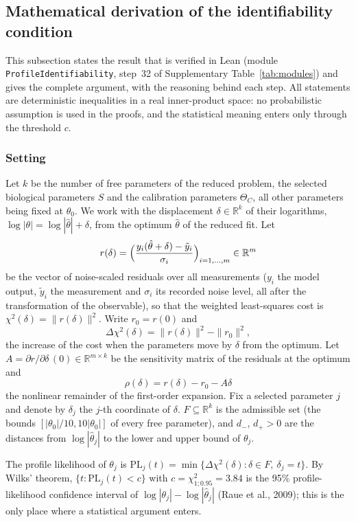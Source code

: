 \subsection*{Mathematical derivation of the identifiability condition}

This subsection states the result that is verified in Lean (module \texttt{ProfileIdentifiability}, step~32 of Supplementary Table~\ref{tab:modules}) and gives the complete argument, with the reasoning behind each step. All statements are deterministic inequalities in a real inner-product space: no probabilistic assumption is used in the proofs, and the statistical meaning enters only through the threshold $c$.

\subsubsection*{Setting}

Let $k$ be the number of free parameters of the reduced problem, the selected biological parameters $S$ and the calibration parameters $\Theta_C$, all other parameters being fixed at $\theta_0$. We work with the displacement $\delta\in\mathbb{R}^k$ of their logarithms, $\log|\theta|=\log|\hat\theta|+\delta$, from the optimum $\hat\theta$ of the reduced fit. Let
\[ r(\delta)=\Bigl(\frac{y_i(\hat\theta+\delta)-\tilde y_i}{\sigma_i}\Bigr)_{i=1,\dots,m}\in\mathbb{R}^m \]
be the vector of noise-scaled residuals over all measurements ($y_i$ the model output, $\tilde y_i$ the measurement and $\sigma_i$ its recorded noise level, all after the transformation of the observable), so that the weighted least-squares cost is $\chi^2(\delta)=\|r(\delta)\|^2$. Write $r_0=r(0)$ and
\[ \Delta\chi^2(\delta)=\|r(\delta)\|^2-\|r_0\|^2 , \]
the increase of the cost when the parameters move by $\delta$ from the optimum. Let $A=\partial r/\partial\delta\,(0)\in\mathbb{R}^{m\times k}$ be the sensitivity matrix of the residuals at the optimum and
\[ \rho(\delta)=r(\delta)-r_0-A\delta \]
the nonlinear remainder of the first-order expansion. Fix a selected parameter $j$ and denote by $\delta_j$ the $j$-th coordinate of $\delta$. $F\subseteq\mathbb{R}^k$ is the admissible set (the bounds $[|\theta_0|/10,10|\theta_0|]$ of every free parameter), and $d_-$, $d_+>0$ are the distances from $\log|\hat\theta_j|$ to the lower and upper bound of $\theta_j$.

The profile likelihood of $\theta_j$ is $\mathrm{PL}_j(t)=\min\{\Delta\chi^2(\delta):\delta\in F,\ \delta_j=t\}$. By Wilks' theorem, $\{t:\mathrm{PL}_j(t)<c\}$ with $c=\chi^2_{1;0.95}=3.84$ is the 95\% profile-likelihood confidence interval of $\log|\theta_j|-\log|\hat\theta_j|$ (Raue et al., 2009); this is the only place where a statistical argument enters.

